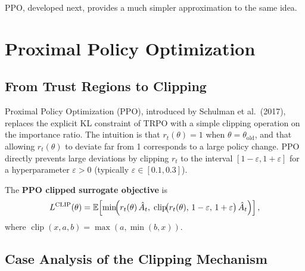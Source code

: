 PPO, developed next, provides a much simpler approximation to the same idea.

\section{Proximal Policy Optimization}
\label{sec:ppo}

\subsection{From Trust Regions to Clipping}

Proximal Policy Optimization (PPO),
introduced by Schulman et al.~(2017), replaces the explicit KL constraint
of TRPO with a simple clipping operation on the importance ratio.
The intuition is that $r_t(\theta) = 1$ when $\theta = \theta_\mathrm{old}$,
and that allowing $r_t(\theta)$ to deviate far from 1 corresponds to a large
policy change.  PPO directly prevents large deviations by clipping $r_t$
to the interval $[1-\varepsilon, 1+\varepsilon]$ for a hyperparameter
$\varepsilon > 0$ (typically $\varepsilon \in [0.1, 0.3]$).

\begin{definition}
\label{def:ppo-clip}
The \textbf{PPO clipped surrogate objective} is
\begin{equation}
\label{eq:ppo-clip}
L^{\mathrm{CLIP}}(\theta)
= \operatorname{\mathbb{E}}\!\left[\min\!\Bigl(
    r_t(\theta)\,\hat{A}_t,\;
    \operatorname{clip}\!\bigl(r_t(\theta),\,1-\varepsilon,\,1+\varepsilon\bigr)
    \,\hat{A}_t
  \Bigr)\right],
\end{equation}
where $\operatorname{clip}(x, a, b) = \max(a, \min(b, x))$.
\end{definition}

\subsection{Case Analysis of the Clipping Mechanism}

